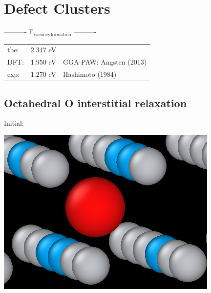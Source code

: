 \documentclass[11pt]{article}
\begin{document}
\section{Defect Clusters}
\label{sec:orgfb31259}

----------     E\(_{\text{vacancy}}\)\(_{\text{formation}}\)     ----------

\begin{center}
\begin{tabular}{lll}
tbe: & 2.347  eV & \\
DFT: & 1.950  eV & GGA-PAW:   Angsten  (2013)\\
exp: & 1.270  eV & Hashimoto  (1984)\\
\end{tabular}
\end{center}

\subsection{Octahedral O interstitial relaxation}
\label{sec:org10feaf0}

Initial:
\begin{center}
\includegraphics[width=.9\linewidth]{Images/initial_octahedral_ox_ovito.png}
\end{center}
\end{document}
